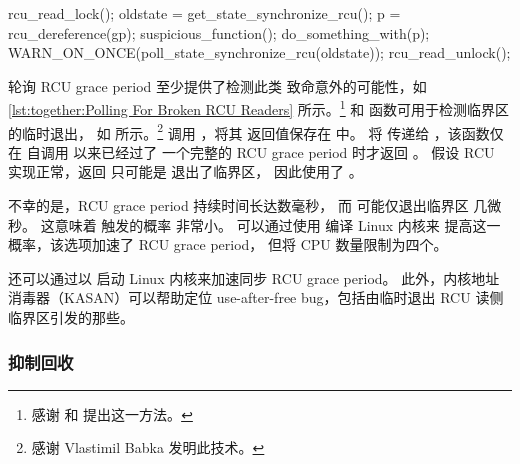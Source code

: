 \begin{listing}[tbp] 
{ \scriptsize
\begin{fcvlabel}
\begin{VerbatimL}[commandchars=\\\[\]]
rcu_read_lock();					\lnlbl[rrl]
oldstate = get_state_synchronize_rcu();			\lnlbl[gssr]
p = rcu_dereference(gp);				\lnlbl[rd]
suspicious_function();					\lnlbl[sf]
do_something_with(p);					\lnlbl[dsw]
WARN_ON_ONCE(poll_state_synchronize_rcu(oldstate));	\lnlbl[pssr]
rcu_read_unlock();					\lnlbl[rrul]
\end{VerbatimL}
\end{fcvlabel}
}
\caption{Polling For Broken RCU Readers}
\label{lst:together:Polling For Broken RCU Readers}
\end{listing}

\begin{fcvref}
轮询 RCU grace period 至少提供了检测此类
致命意外的可能性，如
\cref{lst:together:Polling For Broken RCU Readers} 所示。\footnote{
	感谢  和 
	提出这一方法。}
 和 
函数可用于检测临界区的临时退出，
如  所示。\footnote{
	感谢 Vlastimil Babka 发明此技术。}
 调用 ，将其
返回值保存在  中。
 将  传递给
，该函数仅在
自调用  以来已经过了
一个完整的 RCU grace period 时才返回 。
假设 RCU 实现正常，返回  只可能是
 退出了临界区，
因此使用了 。
\end{fcvref}

不幸的是，RCU grace period 持续时间长达数毫秒，
而  可能仅退出临界区
几微秒。
这意味着  触发的概率
非常小。
可以通过使用  编译 Linux 内核来
提高这一概率，该选项加速了 RCU grace period，
但将 CPU 数量限制为四个。

还可以通过以  启动
Linux 内核来加速同步 RCU grace period。
此外，内核地址消毒器（KASAN）可以帮助定位
use-after-free bug，包括由临时退出
RCU 读侧临界区引发的那些。

\subsubsection{抑制回收}
\label{sec:together:Restraining Reclamation}

